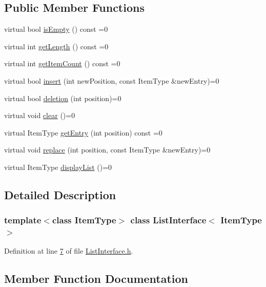 \subsection*{Public Member Functions}
\begin{DoxyCompactItemize}
\item 
virtual bool \hyperlink{classListInterface_a924f91e7f81d7dcd3fda79bbcc671394}{is\+Empty} () const =0
\item 
virtual int \hyperlink{classListInterface_afc85695d4137f1e29ff02e179c9f3221}{get\+Length} () const =0
\item 
virtual int \hyperlink{classListInterface_a3e085e6ea9c5dc3e8007010cd889159c}{get\+Item\+Count} () const =0
\item 
virtual bool \hyperlink{classListInterface_a5b2f86954a86172699a3495982c38e77}{insert} (int new\+Position, const Item\+Type \&new\+Entry)=0
\item 
virtual bool \hyperlink{classListInterface_a68520ce2942ec716c745b1137c50a3c6}{deletion} (int position)=0
\item 
virtual void \hyperlink{classListInterface_adfda414908b645bdf19bcab8269168b7}{clear} ()=0
\item 
virtual Item\+Type \hyperlink{classListInterface_a86987f69e5056d287212ede41db1956a}{get\+Entry} (int position) const =0
\item 
virtual void \hyperlink{classListInterface_aae877a56b7b9f5f526c37a00e234fad1}{replace} (int position, const Item\+Type \&new\+Entry)=0
\item 
virtual Item\+Type \hyperlink{classListInterface_a2f2f533e962dd89111ee50b972dc28e7}{display\+List} ()=0
\end{DoxyCompactItemize}


\subsection{Detailed Description}
\subsubsection*{template$<$class Item\+Type$>$\newline
class List\+Interface$<$ Item\+Type $>$}



Definition at line \hyperlink{ListInterface_8h_source_l00007}{7} of file \hyperlink{ListInterface_8h_source}{List\+Interface.\+h}.



\subsection{Member Function Documentation}
\mbox{\label{classListInterface_adfda414908b645bdf19bcab8269168b7}} 
